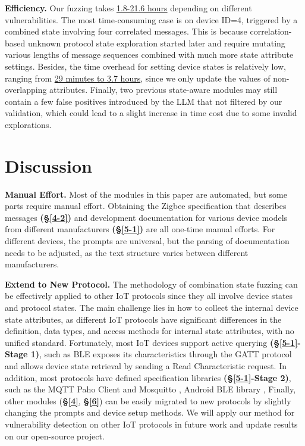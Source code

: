 \documentclass[10pt,journal,compsoc]{IEEEtran}
\begin{document}
\textbf{Efficiency.} Our fuzzing takes \underline{1.8-21.6 hours} depending on different vulnerabilities. The most time-consuming case is on device ID=4, triggered by a combined state involving four correlated messages. This is because correlation-based unknown protocol state exploration started later and require mutating various lengths of message sequences combined with much more state attribute settings. Besides, the time overhead for setting device states is relatively low, ranging from \underline{29 minutes to 3.7 hours}, since we only update the values of non-overlapping attributes. Finally, two previous state-aware modules may still contain a few false positives introduced by the LLM that not filtered by our validation, which could lead to a slight increase in time cost due to some invalid explorations.


\section{Discussion} 

\textbf{Manual Effort.} Most of the modules in this paper are automated, but some parts require manual effort. Obtaining the Zigbee specification that describes messages \textbf{(\S\ref{4-2})} and development documentation for various device models from different manufacturers \textbf{(\S\ref{5-1})} are all one-time manual efforts. For different devices, the prompts are universal, but the parsing of  documentation needs to be adjusted, as the text structure varies between different manufacturers. \\ \vspace{-0.3cm}

\noindent \textbf{Extend to New Protocol.} The methodology of combination state fuzzing can be effectively applied to other IoT protocols since they all involve device states and protocol states. The main challenge lies in how to collect the internal device state attributes, as different IoT protocols have significant differences in the definition, data types, and access methods for internal state attributes, with no unified standard. Fortunately, most IoT devices support active querying \textbf{(\S\ref{5-1}-Stage 1)}, such as BLE exposes its characteristics through the GATT protocol and allows device state retrieval by sending a Read Characteristic request. In addition, most protocols have defined specification libraries \textbf{(\S\ref{5-1}-Stage 2)}, such as the MQTT Paho Client \cite{mqtt1} and Mosquitto \cite{mqtt2}, Android BLE library \cite{bluetooth}, Finally, other modules (\textbf{\S\ref{4}}, \textbf{\S\ref{6}}) can be easily migrated to new protocols by slightly changing the prompts and device setup methods. We will apply our method for vulnerability detection on other IoT protocols in future work and update results on our open-source project.
\end{document}
